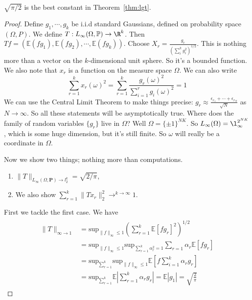 \begin{cor} $\sqrt{\pi/2}$ is the best constant in Theorem~\ref{thm:lgt}. \\
\end{cor}
\begin{proof}
Define $g_1, \cdots, g_k$ be i.i.d standard Gaussians, defined on probability space $(\Omega, P)$. We define $T: L_{\infty}(\Omega, \mathbb{P}) \to \R^k$. Then $Tf = \left(\mathbb{E}(fg_1), \mathbb{E}(fg_2), \cdots, \mathbb{E}(fg_k) \right)$. Choose $X_r = \frac{g_r}{\left(\sum_i^k g_i^2\right)^{1/2}}$. This is nothing more than a vector on the $k$-dimensional unit sphere. So it's a bounded function. We also note that $x_r$ is a function on the measure space $\Omega$.  We can also write
\[
\sum_{r = 1}^k x_r(\omega)^2 = \sum_{r = 1}^k \frac{g_r(\omega)^2}{\sum_{i = 1}^r g_i(\omega)^2} = 1
\]
We can use the Central Limit Theorem to make things precise: $g_r \approx \frac{\epsilon_{r_1} + \cdots + \epsilon_{r_N}}{\sqrt{N}}$ as $N \to \infty$. So all these statements will be asymptotically true. Where does the family of random variables $\{g_r\}$ live in $\Omega$? Well $\Omega = \{\pm 1\}^{NK}$. So $L_{\infty}(\Omega) = \l_{\infty}^{2^{NK}}$, which is some huge dimension, but it's still finite. So $\omega$ will really be a coordinate in $\Omega$. 

Now we show two things; nothing more than computations. 
\begin{enumerate}

\item $\|T\|_{L_{\infty}(\Omega, \textbf{P}) \to l_2^k} = \sqrt{2/\pi}$, 

\item We also show $\sum_{r = 1}^k \|Tx_r\|_2^2 \to^{k \to \infty} 1$. 

\end{enumerate}

First we tackle the first case. We have 
\begin{align}
\begin{split}
\|T\|_{\infty \to 1} &= \text{sup}_{\|f\|_{\infty} \leq 1}\left(\sum_{r = 1}^k \mathbb{E}\left[fg_r\right]^2 \right)^{1/2}
\\
&= \text{sup}_{\|f\|_{\infty} \leq 1} \text{sup}_{\sum_{r = 1}^k \alpha_r^2 = 1} \sum_{r = 1}\alpha_r \mathbb{E}\left[fg_r\right]
\\
&= \text{sup}_{\sum_{r = 1}^k} \text{sup}_{\|f\|_{\infty} \leq 1} \mathbb{E}\left[f\sum_{i = 1}^k \alpha_r g_r \right]
\\
&= \text{sup}_{\sum_{r = 1}^k} \mathbb{E}\left| \sum_{r = 1}^k \alpha_r g_r \right| = \mathbb{E} |g_1| = \sqrt{\frac{2}{\pi}}
\end{split}
\end{align}


\end{proof}
